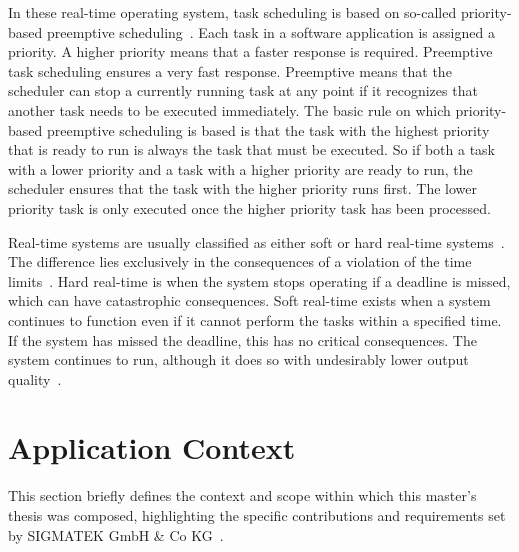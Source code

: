 \documentclass[MMR,Master,english]{twbook}
\begin{document}
\noindent In these real-time operating system, task scheduling is based on so-called priority-based preemptive scheduling~\cite{buttazzoHardRealtimeComputing2024}. Each task in a software application is assigned a priority. A higher priority means that a faster response is required. Preemptive task scheduling ensures a very fast response. Preemptive means that the scheduler can stop a currently running task at any point if it recognizes that another task needs to be executed immediately. The basic rule on which priority-based preemptive scheduling is based is that the task with the highest priority that is ready to run is always the task that must be executed. So if both a task with a lower priority and a task with a higher priority are ready to run, the scheduler ensures that the task with the higher priority runs first. The lower priority task is only executed once the higher priority task has been processed.

\bigskip \noindent Real-time systems are usually classified as either soft or hard real-time systems~\cite{lipariRealTimeSchedulingHard}. The difference lies exclusively in the consequences of a violation of the time limits~\cite{HardRealTime}. Hard real-time is when the system stops operating if a deadline is missed, which can have catastrophic consequences. Soft real-time exists when a system continues to function even if it cannot perform the tasks within a specified time. If the system has missed the deadline, this has no critical consequences. The system continues to run, although it does so with undesirably lower output quality~\cite{queirozTestingLimitsGeneralpurpose2023}.

\section{Application Context}\label{sec:application_context}
This section briefly defines the context and scope within which this master's thesis was composed, highlighting the specific contributions and requirements set by SIGMATEK GmbH \& Co KG~\cite{pixelartSIGMATEKKompletteAutomatisierungssysteme}.
\end{document}
